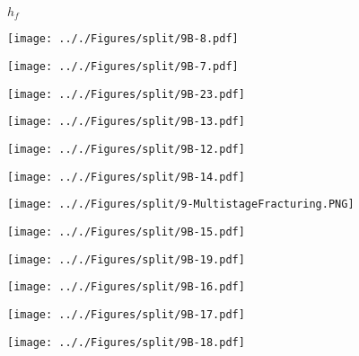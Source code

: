 \documentclass[onecolumn,11pt]{report}
\def\lthtmlcheckvsize{\ifdim\ht\sizebox<\vsize 
  \ifdim\wd\sizebox<\hsize\expandafter\hfill\fi \expandafter\vfill
  \else\expandafter\vss\fi}%
\begin{document}
{\newpage\clearpage
{}%
$ h_f$%
\lthtmlindisplaymathZ
\lthtmlcheckvsize\clearpage}

{\newpage\clearpage
{}%
\texttt{[image: .././Figures/split/9B-8.pdf]}%
\lthtmlpictureZ
\lthtmlcheckvsize\clearpage}

{\newpage\clearpage
{}%
\texttt{[image: .././Figures/split/9B-7.pdf]}%
\lthtmlpictureZ
\lthtmlcheckvsize\clearpage}

{\newpage\clearpage
{}%
\texttt{[image: .././Figures/split/9B-23.pdf]}%
\lthtmlpictureZ
\lthtmlcheckvsize\clearpage}

{\newpage\clearpage
{}%
\texttt{[image: .././Figures/split/9B-13.pdf]}%
\lthtmlpictureZ
\lthtmlcheckvsize\clearpage}

{\newpage\clearpage
{}%
\texttt{[image: .././Figures/split/9B-12.pdf]}%
\lthtmlpictureZ
\lthtmlcheckvsize\clearpage}

{\newpage\clearpage
{}%
\texttt{[image: .././Figures/split/9B-14.pdf]}%
\lthtmlpictureZ
\lthtmlcheckvsize\clearpage}

{\newpage\clearpage
{}%
\texttt{[image: .././Figures/split/9-MultistageFracturing.PNG]}%
\lthtmlpictureZ
\lthtmlcheckvsize\clearpage}

{\newpage\clearpage
{}%
\texttt{[image: .././Figures/split/9B-15.pdf]}%
\lthtmlpictureZ
\lthtmlcheckvsize\clearpage}

{\newpage\clearpage
{}%
\texttt{[image: .././Figures/split/9B-19.pdf]}%
\lthtmlpictureZ
\lthtmlcheckvsize\clearpage}

{\newpage\clearpage
{}%
\texttt{[image: .././Figures/split/9B-16.pdf]}%
\lthtmlpictureZ
\lthtmlcheckvsize\clearpage}

{\newpage\clearpage
{}%
\texttt{[image: .././Figures/split/9B-17.pdf]}%
\lthtmlpictureZ
\lthtmlcheckvsize\clearpage}

{\newpage\clearpage
{}%
\texttt{[image: .././Figures/split/9B-18.pdf]}%
\lthtmlpictureZ
\lthtmlcheckvsize\clearpage}
\end{document}
